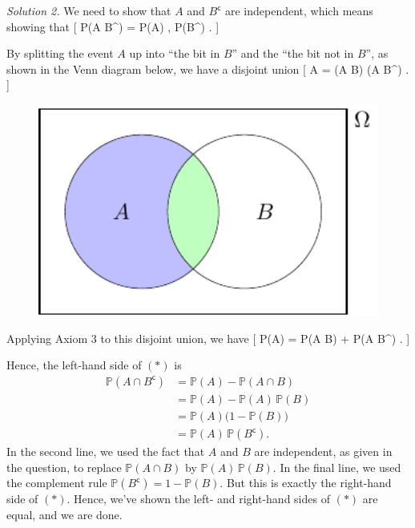 \documentclass[
  letterpaper,
]{report}
\theoremstyle{definition}
\theoremstyle{definition}
\theoremstyle{remark}
\begin{document}
\emph{Solution 2.} We need to show that \(A\) and \(B^\mathsf{c}\) are
independent, which means showing that {[} \mathbb P(A
\cap B\^{}) = \mathbb P(A) , \mathbb P(B\^{}) .
\tag{$*$} {]}

By splitting the event \(A\) up into ``the bit in \(B\)'' and the ``the
bit not in \(B\)'', as shown in the Venn diagram below, we have a
disjoint union {[} A = (A \cap B) \cup (A \cap B\^{}) . {]}

\begin{figure}

{\centering \includegraphics[width=4.44444in,height=\textheight]{./writing_files/figure-pdf/writing-pic-1-1.pdf}

}

\end{figure}

Applying Axiom 3 to this disjoint union, we have {[} \mathbb P(A) =
\mathbb P(A \cap B) + \mathbb P(A \cap B\^{}) . {]}

Hence, the left-hand side of \((*)\) is \begin{align*}
\mathbb P(A \cap B^\mathsf{c})
&= \mathbb P(A) - \mathbb P(A \cap B) \\
&= \mathbb P(A) - \mathbb P(A)\,\mathbb P(B) \\
&= \mathbb P(A) \big(1 - \mathbb P(B)\big) \\
&= \mathbb P(A) \, \mathbb P(B^\mathsf{c}) .
\end{align*} In the second line, we used the fact that \(A\) and \(B\)
are independent, as given in the question, to replace
\(\mathbb P(A \cap B)\) by \(\mathbb P(A)\,\mathbb P(B)\). In the final
line, we used the complement rule
\(\mathbb P(B^\mathsf{c}) = 1 - \mathbb P(B)\). But this is exactly the
right-hand side of \((*)\). Hence, we've shown the left- and right-hand
sides of \((*)\) are equal, and we are done.
\end{document}
